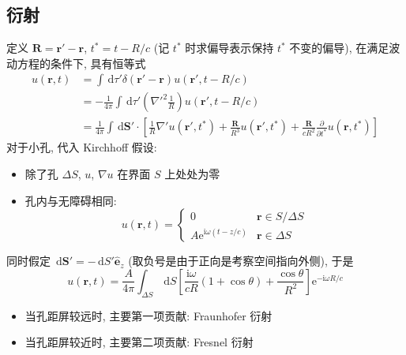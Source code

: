 \documentclass[12pt,a4paper]{article}%
\numberwithin{equation}{section}%
\renewcommand*{\vec}[1]{\bm{#1}}%
\newcommand{\dif}{\,\mathrm d}
\newcommand\mi{\mathrm{i}}
\newcommand\e{\mathrm{e}}%
\newcommand*{\uvec}[1]{\hat{\vec{#1}}}
\begin{document}
\subsection{衍射} %
\label{sub:diffraction}
定义 $\vec R  = \vec r' - \vec r$, $t^* = t - R/c$ (记 $t^*$ 时求偏导表示保持 $t^*$ 不变的偏导), 在满足波动方程的条件下, 具有恒等式
\begin{align*}
    u(\vec r, t) &= \int\dif \tau'\delta(\vec r' - \vec r) u(\vec r', t-R/c) \\
    &= -\frac 1{4\pi}\int\dif \tau'\left(\nabla'^2\frac 1R\right) u(\vec r', t-R/c)\\
    &= \frac 1{4\pi}\int\dif \vec S' \cdot \left[\frac 1R\nabla'u(\vec r',t^*) + \frac{\vec R}{R^3}u(\vec r',t^*) + \frac{\vec R}{cR^2}\frac{\partial}{\partial t^*}u(\vec r,t^*)\right]
\end{align*}
对于小孔, 代入 Kirchhoff 假设:
\begin{itemize}
    \item 除了孔 $\Delta S$, $u$, $\nabla u$ 在界面 $S$ 上处处为零
    \item 孔内与无障碍相同:
    \begin{equation}
        u(\vec r, t) = \begin{cases}
            0 & \vec r\in S/\Delta S \\
            A\e^{\mi\omega(t-z/c)} &\vec r\in\Delta S
        \end{cases}
    \end{equation}
\end{itemize}
同时假定 $\dif\vec S' = -\dif S'\uvec e_z$ (取负号是由于正向是考察空间指向外侧), 于是
\begin{equation}
    u(\vec r,t) = \frac A{4\pi}\int_{\Delta S}\dif S\left[\frac{\mi\omega}{cR}(1+\cos\theta) + \frac{\cos\theta}{R^2}\right]\e^{-\mi\omega R/c}
\end{equation}
\begin{itemize}
    \item 当孔距屏较远时, 主要第一项贡献: Fraunhofer 衍射
    \item 当孔距屏较近时, 主要第二项贡献: Fresnel 衍射
\end{itemize}
\end{document}
